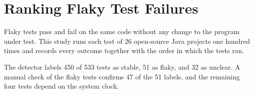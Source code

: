 \documentclass[letterpaper,10pt]{article}
\begin{document}
\section*{Ranking Flaky Test Failures}
Flaky tests pass and fail on the same code without any change to the program under test. This study runs each
test of 26 open-source Java projects one hundred times and records every outcome together with the order in
which the tests ran.

The detector labels 450 of 533 tests as stable, 51 as flaky, and 32 as unclear. A manual check of the flaky tests
confirms 47 of the 51 labels, and the remaining four tests depend on the system clock.
\end{document}
